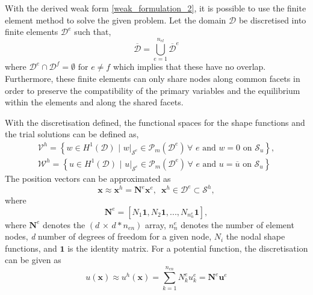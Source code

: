 \documentclass[../main.tex]{subfiles}
\begin{document}
With the derived weak form \eqref{weak_formulation_2}, it is possible to use the finite element method to solve the given problem.
Let the domain $\mathcal{D}$ be discretised into finite elements $\mathcal{D}^{e}$ such that,
\begin{equation}\label{discretisation_definition}
    \overline{\mathcal{D}} = \bigcup^{n_{el}}_{e=1} \overline{\mathcal{D}}^{e}
\end{equation}
where $\mathcal{D}^{e} \cap \mathcal{D}^{f} = \emptyset \, \, \text{for } e \neq f$ which implies that these have no overlap.
 Furthermore, these finite elements can only share nodes along common facets in order to preserve the compatibility 
 of the primary variables and the equilibrium within the elements and along the shared facets. 
 
With the discretisation defined, the functional spaces for the shape functions and the trial solutions can be defined as,
\begin{align}\label{discretised_spaces}
    \mathcal{V}^{h} = \left\{w \in H^{1}(\mathcal{D})\,\, |\,\, w|_{\mathcal{S}^{e}} \in \mathcal{P}_{m}(\mathcal{D}^{e}) \, \forall \,\, e \text{ and } w = 0 \,\, \text{on } \mathcal{S}_{u}\right\},\\
    \mathcal{W}^{h} = \left\{u \in H^{1}(\mathcal{D})\,\, |\,\, u|_{\mathcal{S}^{e}} \in \mathcal{P}_{m}(\mathcal{D}^{e}) \, \forall \,\, e \text{ and } u = \overline{u} \,\, \text{on } \mathcal{S}_{u}\right\}
\end{align}
%
The position vectors can be approximated as
\begin{equation} \label{pos_vectors}
    \boldsymbol{x} \approx \boldsymbol{x}^{h} = \mathbf{N}^{e}\mathbf{x}^{e}, \,\,\, \boldsymbol{x}^{h} \in \mathcal{D}^{e} \subset \mathcal{S}^{h},
\end{equation}
where
\begin{equation} \label{shape_functions}
    \mathbf{N}^{e} = [N_{1}\boldsymbol{1}, N_{2}\boldsymbol{1},...,N_{n^{e}_{n}}\boldsymbol{1}],
\end{equation}
where $\mathbf{N}^{e}$ denotes the $(d \, \times \, d*n_{en})$ array, $n^{e}_{n}$ denotes the number of element nodes, \emph{d} number of degrees of freedom
 for a given node, $N_{i}$ the nodal shape functions, and $\boldsymbol{1}$ is the identity matrix. For a potential function, the discretisation can be given as
 \begin{equation} \label{discretisation_def}
    u(\boldsymbol{x}) \approx u^{h}(\boldsymbol{x}) = \sum^{n_{en}}_{k=1} N^{e}_{k} u^{e}_{k} = \mathbf{N}^{e} \mathbf{u}^{e}
 \end{equation}
\end{document}
